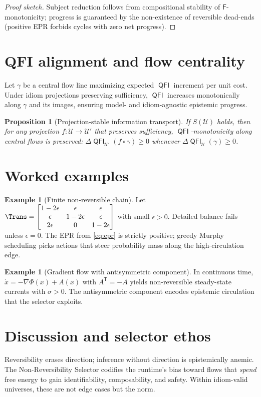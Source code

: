 \documentclass[11pt]{article}
\theoremstyle{plain}
\newtheorem{proposition}[theorem]{Proposition}
\theoremstyle{definition}
\newtheorem{example}[theorem]{Example}
\theoremstyle{remark}
\DeclareMathOperator{\QFI}{\mathsf{QFI}}
\newcommand{\1}{\mathds{1}}
\newcommand{\U}{\mathcal{U}}
\newcommand{\Free}{\mathsf{F}}
\newcommand{\EP}{\sigma} %
\newcommand{\transpose}{\mathsf{T}}
\begin{document}
\begin{proof}[Proof sketch]
Subject reduction follows from compositional stability of $\Free$-monotonicity; progress is guaranteed by the non-existence of reversible dead-ends (positive EPR forbids cycles with zero net progress).
\end{proof}

\section{QFI alignment and flow centrality}
Let $\gamma$ be a central flow line maximizing expected $\QFI$ increment per unit cost. Under idiom projections preserving sufficiency, $\QFI$ increases monotonically along $\gamma$ and its images, ensuring model- and idiom-agnostic epistemic progress.

\begin{proposition}[Projection-stable information transport]
If $S(\U)$ holds, then for any projection $f:\U\to\U'$ that preserves sufficiency, $\QFI$-monotonicity along central flows is preserved: $\Delta\QFI_{\U'}(f\circ\gamma)\ge0$ whenever $\Delta\QFI_\U(\gamma)\ge0$.
\end{proposition}

\section{Worked examples}
\begin{example}[Finite non-reversible chain]
Let $\Trans=\begin{bmatrix}1-2\epsilon & \epsilon & \epsilon\\ \epsilon & 1-2\epsilon & \epsilon\\ 2\epsilon & 0 & 1-2\epsilon\end{bmatrix}$ with small $\epsilon>0$. Detailed balance fails unless $\epsilon=0$. The EPR from \eqref{eq:epr} is strictly positive; greedy Murphy scheduling picks actions that steer probability mass along the high-circulation edge.
\end{example}

\begin{example}[Gradient flow with antisymmetric component]
In continuous time, $\dot{x} = -\nabla \Phi(x) + A(x)$ with $A^\transpose=-A$ yields non-reversible steady-state currents with $\EP>0$. The antisymmetric component encodes epistemic circulation that the selector exploits.
\end{example}

\section{Discussion and selector ethos}
Reversibility erases direction; inference without direction is epistemically anemic. The Non-Reversibility Selector codifies the runtime's bias toward flows that \emph{spend} free energy to gain identifiability, composability, and safety. Within idiom-valid universes, these are not edge cases but the norm.
\end{document}
